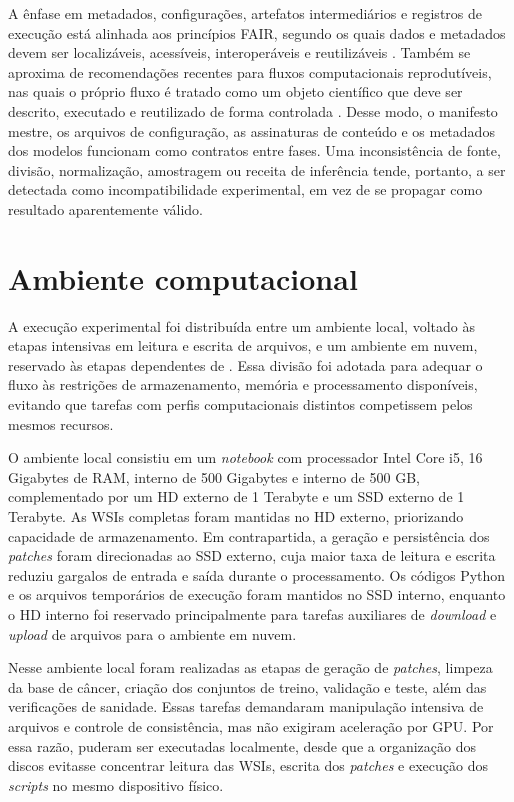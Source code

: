 A ênfase em metadados, configurações, artefatos intermediários e registros de
execução está alinhada aos princípios FAIR, segundo os quais dados e metadados
devem ser localizáveis, acessíveis, interoperáveis e reutilizáveis
\cite{wilkinson2016fair}. Também se aproxima de recomendações recentes para
fluxos computacionais reprodutíveis, nas quais o próprio fluxo é tratado como
um objeto científico que deve ser descrito, executado e reutilizado de forma
controlada \cite{piccolo2016tools}. Desse modo, o manifesto mestre, os arquivos
de configuração, as assinaturas de conteúdo e os metadados dos modelos funcionam
como contratos entre fases. Uma inconsistência de fonte, divisão, normalização,
amostragem ou receita de inferência tende, portanto, a ser detectada como
incompatibilidade experimental, em vez de se propagar como resultado
aparentemente válido.


\section{Ambiente computacional}\label{sec:met_ambiente_computacional}

A execução experimental foi distribuída entre um ambiente local, voltado às etapas intensivas em leitura e escrita de arquivos, e um ambiente em nuvem, reservado às etapas dependentes de . Essa divisão foi adotada para adequar o fluxo às restrições de armazenamento, memória e processamento disponíveis, evitando que tarefas com perfis computacionais distintos competissem pelos mesmos recursos.

O ambiente local consistiu em um \textit{notebook} com processador Intel Core i5, 16 Gigabytes de RAM,  interno de 500 Gigabytes e  interno de 500 GB, complementado por um HD externo de 1 Terabyte e um SSD externo de 1 Terabyte. As WSIs completas foram mantidas no HD externo, priorizando capacidade de armazenamento. Em contrapartida, a geração e persistência dos \textit{patches} foram direcionadas ao SSD externo, cuja maior taxa de leitura e escrita reduziu gargalos de entrada e saída durante o processamento. Os códigos Python e os arquivos temporários de execução foram mantidos no SSD interno, enquanto o HD interno foi reservado principalmente para tarefas auxiliares de \textit{download} e \textit{upload} de arquivos para o ambiente em nuvem.

Nesse ambiente local foram realizadas as etapas de geração de \textit{patches}, limpeza da base de câncer, criação dos conjuntos de treino, validação e teste, além das verificações de sanidade. Essas tarefas demandaram manipulação intensiva de arquivos e controle de consistência, mas não exigiram aceleração por GPU. Por essa razão, puderam ser executadas localmente, desde que a organização dos discos evitasse concentrar leitura das WSIs, escrita dos \textit{patches} e execução dos \textit{scripts} no mesmo dispositivo físico.

